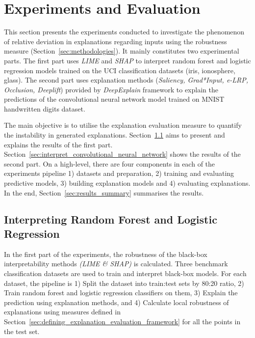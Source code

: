 \documentclass[english]{tktltiki2}
\theoremstyle{definition}
\theoremstyle{remark}
\begin{document}
\section{Experiments and Evaluation}\label{sec:experiments_and_evaluation} %
This section presents the experiments conducted to investigate the phenomenon of relative deviation in explanations regarding inputs using the robustness measure (Section~\ref{sec:methodologies}). It mainly constitutes two experimental parts. The first part uses \textit{LIME} and \textit{SHAP} to interpret random forest and logistic regression models trained on the UCI classification datasets (iris, ionosphere, glass). The second part uses explanation methods (\textit{Saliency, Grad*Input, e-LRP, Occlusion, Deeplift}) provided by \textit{DeepExplain} framework to explain the predictions of the convolutional neural network model trained on MNIST handwritten digits dataset.

The main objective is to utilise the explanation evaluation measure to quantify the instability in generated explanations. Section~\ref{sec:interpret_radnom_forest_and_logistic_regression} aims to present and explains the results of the first part. Section~\ref{sec:interpret_convolutional_neural_network} shows the results of the second part.  On a high-level, there are four components in each of the experiments pipeline 1) datasets and preparation, 2) training and evaluating predictive models, 3) building explanation models and 4) evaluating explanations. In the end, Section~\ref{sec:results_summary} summarises the results.

\subsection{Interpreting Random Forest and Logistic Regression}\label{sec:interpret_radnom_forest_and_logistic_regression}
In the first part of the experiments, the robustness of the black-box interpretability methods \textit{(LIME \& SHAP)} is calculated. Three benchmark classification datasets are used to train and interpret black-box models. For each dataset, the pipeline is 1) Split the dataset into train:test sets by 80:20 ratio, 2) Train random forest and logistic regression classifiers on them, 3) Explain the prediction using explanation methods, and 4) Calculate local robustness of explanations using measures defined in Section~\ref{sec:defining_explanation_evaluation_framework} for all the points in the test set.
\end{document}
